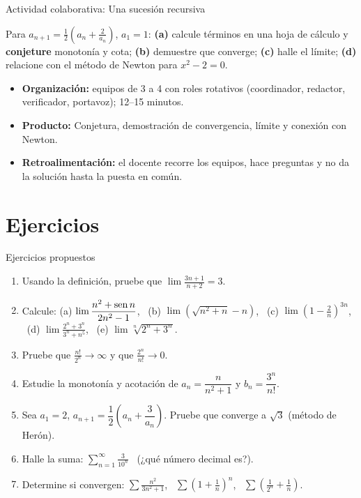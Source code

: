\documentclass[10pt,aspectratio=169]{beamer}
\begin{document}
\begin{frame}{Actividad colaborativa: Una sucesión recursiva}
  \small
  \begin{activa}
    Para $a_{n+1}=\frac12\left(a_n+\frac2{a_n}\right)$, $a_1=1$: \textbf{(a)} calcule términos en una hoja de cálculo y \textbf{conjeture} monotonía y cota; \textbf{(b)} demuestre que converge; \textbf{(c)} halle el límite; \textbf{(d)} relacione con el método de Newton para $x^2-2=0$.
  \end{activa}
  \begin{itemize}
    \item \textbf{Organización:} equipos de 3 a 4 con roles rotativos (coordinador, redactor, verificador, portavoz); 12--15 minutos.
    \item \textbf{Producto:} Conjetura, demostración de convergencia, límite y conexión con Newton.
    \item \textbf{Retroalimentación:} el docente recorre los equipos, hace preguntas y no da la solución hasta la puesta en común.
  \end{itemize}
\end{frame}

\section{Ejercicios}

\begin{frame}{Ejercicios propuestos}
  \small
  \begin{ejercicio}
    \begin{enumerate}
      \item Usando la definición, pruebe que $\displaystyle\lim\frac{3n+1}{n+2}=3$.
      \item Calcule: (a) $\displaystyle\lim\frac{n^2+\operatorname{sen} n}{2n^2-1}$, \ (b) $\displaystyle\lim\left(\sqrt{n^2+n}-n\right)$,
        \ (c) $\displaystyle\lim\left(1-\frac2n\right)^{3n}$, \ (d) $\displaystyle\lim\frac{2^n+3^n}{3^n+n^5}$, \ (e) $\displaystyle\lim\sqrt[n]{2^n+3^n}$.
      \item Pruebe que $\frac{n!}{2^n}\to\infty$ y que $\frac{2^n}{n!}\to0$.
      \item Estudie la monotonía y acotación de $a_n=\dfrac{n}{n^2+1}$ y $b_n=\dfrac{3^n}{n!}$.
      \item Sea $a_1=2$, $a_{n+1}=\dfrac12\left(a_n+\dfrac{3}{a_n}\right)$. Pruebe que converge a $\sqrt3$ (método de Herón).
      \item Halle la suma: $\displaystyle\sum_{n=1}^\infty\frac{3}{10^n}$ \ (¿qué número decimal es?).
      \item Determine si convergen: $\displaystyle\sum\frac{n^2}{3n^2+1}$, \ $\displaystyle\sum\left(1+\frac1n\right)^n$, \ $\displaystyle\sum\left(\frac{1}{2^n}+\frac1n\right)$.
    \end{enumerate}
  \end{ejercicio}
\end{frame}
\end{document}
